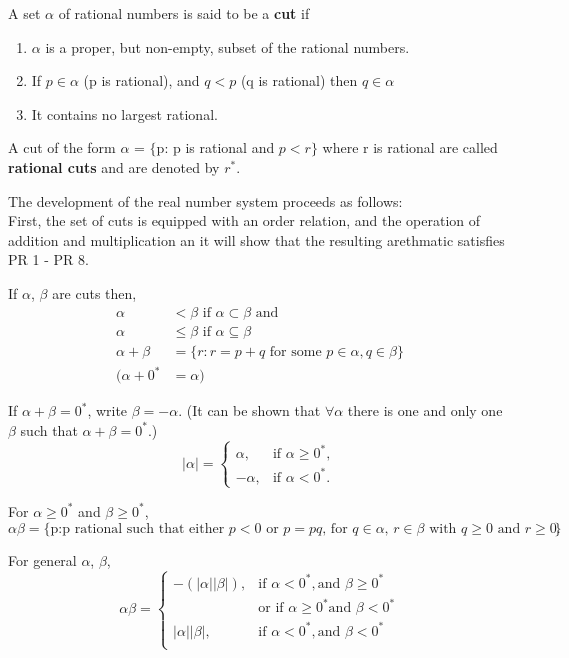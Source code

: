 \documentclass[11pt,fleqn]{book} %
\begin{document}
\begin{definition}
	A set $\alpha$ of rational numbers is said to be a \textbf{cut} if
	\begin{enumerate}
		\item $\alpha$ is a proper, but non-empty, subset of the rational numbers.
		\item If $p \in \alpha$ (p is rational), and $q<p$ (q is rational) then $q \in \alpha$
		\item It contains no largest rational.
	\end{enumerate}
	A cut of the form $\alpha$ = $\{$p: p is rational and $p<r\}$ where r is rational are called \textbf{rational cuts} and are denoted by $r^*$.
\end{definition}

The development of the real number system proceeds as follows:\\
First, the set of cuts is equipped with an order relation, and the operation of addition and multiplication an it will show that the resulting arethmatic satisfies PR 1 - PR 8.  

If $\alpha$, $\beta$ are cuts then, 
\begin{align*}
	\alpha &< \beta \text{ if $\alpha \subset \beta$ and} \\
	\alpha &\le \beta \text{ if $\alpha \subseteq \beta$}\\
	\alpha + \beta &= \{r: r= p + q \text{ for some } p \in \alpha, q \in \beta\}\\
	(\alpha + 0^* &= \alpha)
\end{align*}

If $\alpha + \beta = 0^*$, write $\beta = -\alpha$. (It can be shown that $\forall \alpha$ there is one and only one $\beta$ such that $\alpha + \beta = 0^*$.) 
$$|\alpha| = \begin{cases}
  \alpha, & \text{if } \alpha \ge 0^*, \\
  -\alpha, & \text{if } \alpha < 0^* .
\end{cases} $$

For $\alpha \ge 0^*$ and $\beta \ge 0^*$, 
$$\alpha\beta = \{\text{p:p rational such that either $p<0$ or $p=pq$, for $q \in \alpha$, $r \in \beta$ with $q \ge 0$ and $r \ge 0$.}\}$$ 

For general $\alpha$, $\beta$,
$$\alpha\beta = \begin{cases}
  -(|\alpha||\beta|), & \text{if } \alpha < 0^*, \text{and } \beta \ge 0^*\\
  	& \text{or if } \alpha \ge 0^* \text{and } \beta < 0^*\\
  |\alpha||\beta|, & \text{if } \alpha < 0^*, \text{and } \beta < 0^*\\
\end{cases} $$
\end{document}
